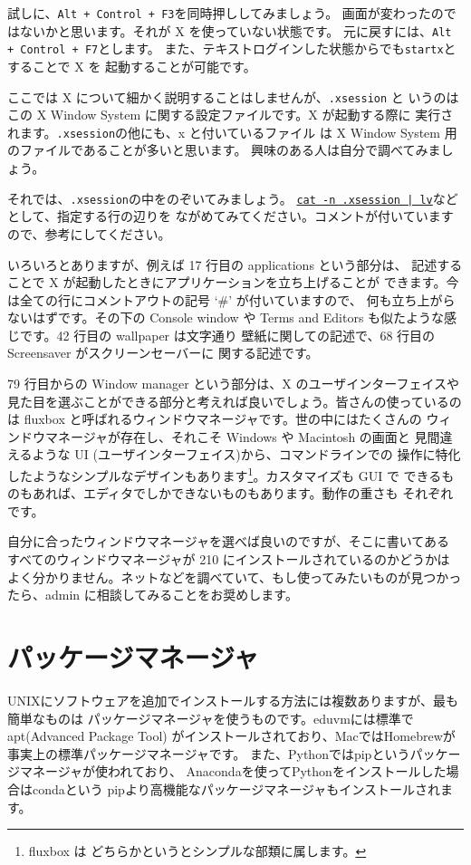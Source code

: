 \documentclass[a4j]{ltjsreport}
\begin{document}
    試しに、\verb|Alt + Control + F3|を同時押ししてみましょう。
    画面が変わったのではないかと思います。それが X を使っていない状態です。
    元に戻すには、\verb|Alt + Control + F7|とします。
    また、テキストログインした状態からでも\verb+startx+とすることで X を
    起動することが可能です。

    ここでは X について細かく説明することはしませんが、\verb+.xsession+ と
    いうのはこの X Window System に関する設定ファイルです。X が起動する際に
    実行されます。\verb+.xsession+の他にも、x と付いているファイル
    は X Window System 用のファイルであることが多いと思います。
    興味のある人は自分で調べてみましょう。

    それでは、\verb+.xsession+の中をのぞいてみましょう。
    \underline{\texttt{cat -n .xsession | lv}}などとして、指定する行の辺りを
    ながめてみてください。コメントが付いていますので、参考にしてください。

    いろいろとありますが、例えば 17 行目の applications という部分は、
    記述することで X が起動したときにアプリケーションを立ち上げることが
    できます。今は全ての行にコメントアウトの記号 `\#' が付いていますので、
    何も立ち上がらないはずです。その下の Console window や Terms 
    and Editors も似たような感じです。42 行目の wallpaper は文字通り
    壁紙に関しての記述で、68 行目の Screensaver がスクリーンセーバーに
    関する記述です。

    79 行目からの Window manager という部分は、X のユーザインターフェイスや
    見た目を選ぶことができる部分と考えれば良いでしょう。皆さんの使っているの
    は fluxbox と呼ばれるウィンドウマネージャです。世の中にはたくさんの
    ウィンドウマネージャが存在し、それこそ Windows や Macintosh の画面と
    見間違えるような UI (ユーザインターフェイス)から、コマンドラインでの
    操作に特化したようなシンプルなデザインもあります\footnote{fluxbox は
    どちらかというとシンプルな部類に属します。}。カスタマイズも GUI で
    できるものもあれば、エディタでしかできないものもあります。動作の重さも
    それぞれです。

    自分に合ったウィンドウマネージャを選べば良いのですが、そこに書いてある
    すべてのウィンドウマネージャが 210 にインストールされているのかどうかは
    よく分かりません。ネットなどを調べていて、もし使ってみたいものが見つかっ
    たら、admin に相談してみることをお奨めします。

    


    \section{パッケージマネージャ}
    UNIXにソフトウェアを追加でインストールする方法には複数ありますが、最も簡単なものは
    パッケージマネージャを使うものです。eduvmには標準でapt(Advanced Package Tool)
    がインストールされており、MacではHomebrewが事実上の標準パッケージマネージャです。
    また、Pythonではpipというパッケージマネージャが使われており、
    Anacondaを使ってPythonをインストールした場合はcondaという
    pipより高機能なパッケージマネージャもインストールされます。
\end{document}
